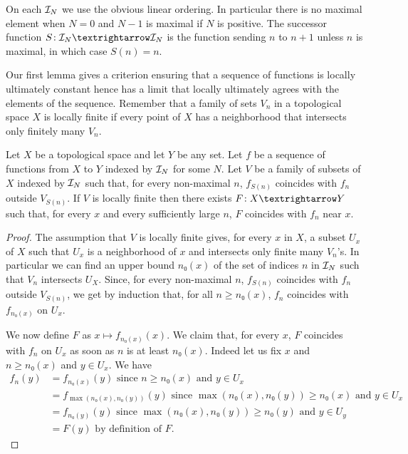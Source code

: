 On each $\mathcal{I}_{N}$ we use the obvious linear ordering. In particular there is no
maximal element when $N = 0$ and $N-1$ is maximal if $N$ is positive.
The successor function $S \co \IT{N} → \IT{N}$ is the function sending $n$ to
$n+1$ unless $n$ is maximal, in which case $S(n) = n$.

Our first lemma gives a criterion ensuring that a sequence of functions is locally
ultimately constant hence has a limit that locally ultimately agrees with the
elements of the sequence.
Remember that a family of sets $V_n$ in a topological space $X$ is locally finite if
every point of $X$ has a neighborhood that intersects only finitely many $V_n$.

\begin{lemma}
  \label{lem:exists_forall_eventually_of_index_type}
  \leanok
  Let $X$ be a topological space and let $Y$ be any set. Let
  $f$ be a sequence of functions from $X$ to $Y$ indexed by $\mathcal{I}_{N}$
  for some $N$. Let $V$ be a family of subsets of $X$ indexed by $\mathcal{I}_{N}$
  such that, for every non-maximal $n$, $f_{S(n)}$ coincides with $f_n$ outside
  $V_{S(n)}$. If $V$ is locally finite then there exists $F \co X → Y$ such
  that, for every $x$ and every sufficiently large $n$,
  $F$ coincides with $f_n$ near $x$.
\end{lemma}

\begin{proof}\leanok
  The assumption that $V$ is locally finite gives, for every $x$ in $X$, a
  subset $U_x$ of $X$ such that $U_x$ is a neighborhood of $x$ and intersects
  only finite many $V_n$'s. In particular we can find an upper bound $n₀(x)$ of the set
  of indices $n$ in $\mathcal{I}_{N}$ such that $V_n$ intersects $U_X$.
  Since, for every non-maximal $n$, $f_{S(n)}$ coincides with $f_n$ outside
  $V_{S(n)}$, we get by induction that, for all $n ≥ n₀(x)$, $f_n$ coincides
  with $f_{n₀(x)}$ on $U_x$.

  We now define $F$ as $x ↦ f_{n₀(x)}(x)$. We claim that, for every $x$,
  $F$ coincides with $f_n$ on $U_x$ as soon as $n$ is at least $n₀(x)$.
  Indeed let us fix $x$ and $n ≥ n₀(x)$ and $y ∈ U_x$. We have
  \begin{align*}
    f_n(y) &= f_{n₀(x)}(y) \text{ since $n ≥ n₀(x)$ and $y ∈ U_x$}\\
           &= f_{\max(n₀(x), n₀(y))}(y) \text{ since $\max(n₀(x), n₀(y)) ≥ n₀(x)$ and $y ∈ U_x$}\\
           &= f_{n₀(y)}(y) \text{ since $\max(n₀(x), n₀(y)) ≥ n₀(y)$ and $y ∈ U_y$}\\
           &= F(y) \text{ by definition of $F$}.
  \end{align*}
\end{proof}


